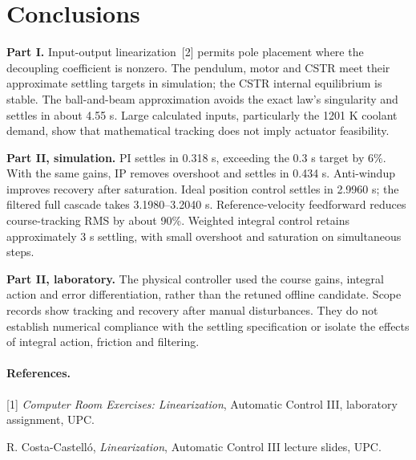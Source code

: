 \section*{Conclusions}
\textbf{Part I.} Input-output linearization~[2] permits pole placement where the decoupling coefficient is nonzero. The pendulum, motor and CSTR meet their approximate settling targets in simulation; the CSTR internal equilibrium is stable. The ball-and-beam approximation avoids the exact law's singularity and settles in about 4.55 s. Large calculated inputs, particularly the 1201 K coolant demand, show that mathematical tracking does not imply actuator feasibility.

\textbf{Part II, simulation.} PI settles in 0.318 s, exceeding the 0.3 s target by 6\%. With the same gains, IP removes overshoot and settles in 0.434 s. Anti-windup improves recovery after saturation. Ideal position control settles in 2.9960 s; the filtered full cascade takes 3.1980--3.2040 s. Reference-velocity feedforward reduces course-tracking RMS by about 90\%. Weighted integral control retains approximately 3 s settling, with small overshoot and saturation on simultaneous steps.

\textbf{Part II, laboratory.} The physical controller used the course gains, integral action and error differentiation, rather than the retuned offline candidate. Scope records show tracking and recovery after manual disturbances. They do not establish numerical compliance with the settling specification or isolate the effects of integral action, friction and filtering.

\paragraph{References.}
{\small [1] \textit{Computer Room Exercises: Linearization}, Automatic Control III, laboratory assignment, UPC.\par
[2] R. Costa-Castell\'o, \textit{Linearization}, Automatic Control III lecture slides, UPC.}
